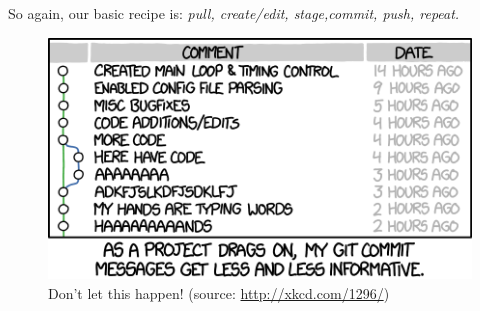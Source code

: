 \documentclass[12pt,letterpaper]{article}
\begin{document}
So again, our basic recipe is:
\emph{pull, create/edit, stage,commit, push, repeat.}

\begin{figure}[!h]
	\centering
	\includegraphics[width=0.7\linewidth]{figs/xkcd_git_commit}
	\caption{Don't let this happen!  (source: \url{http://xkcd.com/1296/})}
	\label{fig:commit_messages}
\end{figure}




\end{document}
